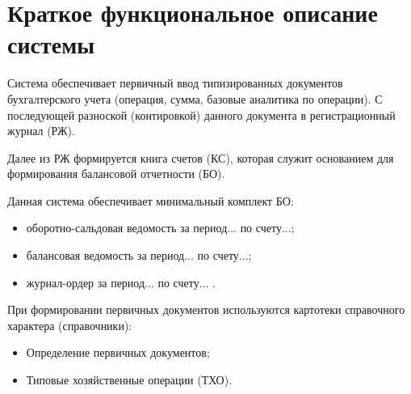 \section{Краткое функциональное описание системы}

Система обеспечивает первичный ввод типизированных документов бухгалтерского учета
(операция, сумма, базовые аналитика по операции).
С последующей разноской (контировкой) данного документа в регистрационный журнал (РЖ). 

Далее из РЖ формируется книга счетов (КС),
которая служит основанием для формирования балансовой отчетности (БО).

Данная система обеспечивает минимальный комплект БО:
\begin{itemize}
    \item оборотно-сальдовая ведомость за период... по счету...;
    \item балансовая ведомость за период... по счету...;
    \item журнал-ордер за период... по счету... .
\end{itemize}


При формировании первичных документов используются картотеки справочного характера (справочники):
\begin{itemize}
    \item Определение первичных документов;
    \item Типовые хозяйственные операции (ТХО).
\end{itemize}

\newpage
